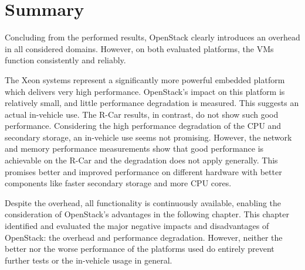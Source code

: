     \section{Summary}
    \label{section:summary}
        
        Concluding from the performed results, OpenStack clearly introduces an overhead in all considered domains.
        However, on both evaluated platforms, the VMs function consistently and reliably. 
        
        \noindent The Xeon systems represent a significantly more powerful embedded platform which delivers very high performance.
        OpenStack's impact on this platform is relatively small, and little performance degradation is measured. 
        This suggests an actual in-vehicle use.
        The R-Car results, in contrast, do not show such good performance.
        Considering the high performance degradation of the CPU and secondary storage, an in-vehicle use seems not promising.
        However, the network and memory performance measurements show that good performance is achievable on the R-Car and the degradation does not apply generally.
        This promises better and improved performance on different hardware with better components like faster secondary storage and more CPU cores.
        
        \noindent Despite the overhead, all functionality is continuously available, enabling the consideration of OpenStack's advantages in the following chapter.
        This chapter identified and evaluated the major negative impacts and disadvantages of OpenStack: the overhead and performance degradation.
        However, neither the better nor the worse performance of the platforms used do entirely prevent further tests or the in-vehicle usage in general. 
